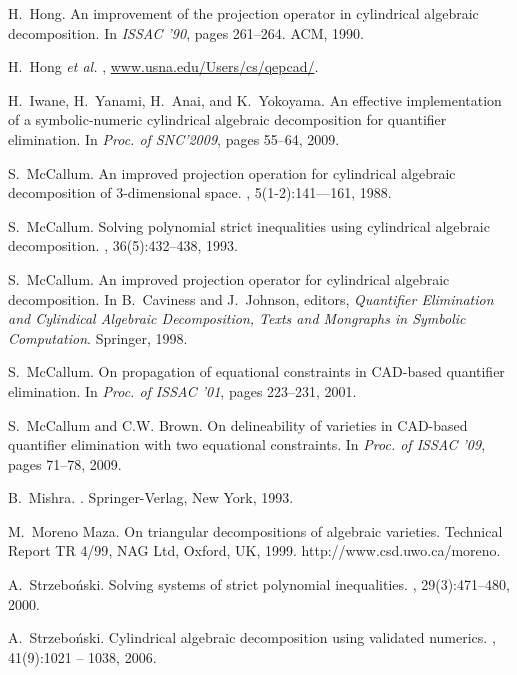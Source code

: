 \documentclass[10pt]{article}
\begin{document}
\begin{center}
\begin{thebibliography}{10}
H.~Hong.
\newblock An improvement of the projection operator in cylindrical algebraic
  decomposition.
\newblock In {\em ISSAC '90}, pages 261--264. ACM, 1990.

H.~{Hong {\it et al.}}
, \url{www.usna.edu/Users/cs/qepcad/}.

H.~Iwane, H.~Yanami, H.~Anai, and K.~Yokoyama.
\newblock An effective implementation of a symbolic-numeric cylindrical
  algebraic decomposition for quantifier elimination.
\newblock In {\em Proc. of SNC'2009}, pages 55--64, 2009.

S.~McCallum.
\newblock An improved projection operation for cylindrical algebraic
  decomposition of 3-dimensional space.
, 5(1-2):141–--161, 1988.

S.~McCallum.
\newblock Solving polynomial strict inequalities using cylindrical algebraic
  decomposition.
, 36(5):432--438, 1993.

S.~McCallum.
\newblock An improved projection operator for cylindrical algebraic
  decomposition.
\newblock In B.~Caviness and J.~Johnson, editors, {\em Quantifier Elimination
  and Cylindical Algebraic Decomposition, Texts and Mongraphs in Symbolic
  Computation}. Springer, 1998.

S.~McCallum.
\newblock On propagation of equational constraints in {CAD}-based quantifier
  elimination.
\newblock In {\em Proc. of ISSAC '01}, pages 223--231, 2001.

S.~McCallum and C.W. Brown.
\newblock On delineability of varieties in {CAD}-based quantifier elimination
  with two equational constraints.
\newblock In {\em Proc. of ISSAC '09}, pages 71--78, 2009.

B.~Mishra.
.
\newblock Springer-Verlag, New York, 1993.

M.~{{Moreno Maza}}.
\newblock On triangular decompositions of algebraic varieties.
\newblock Technical Report TR {4/99}, NAG Ltd, Oxford, UK, 1999.
\newblock http://www.csd.uwo.ca/moreno.

A.~Strzebo\'{n}ski.
\newblock Solving systems of strict polynomial inequalities.
, 29(3):471--480, 2000.

A.~Strzebo\'{n}ski.
\newblock Cylindrical algebraic decomposition using validated numerics.
, 41(9):1021 -- 1038, 2006.


\end{thebibliography}
\end{center}
\end{document}
